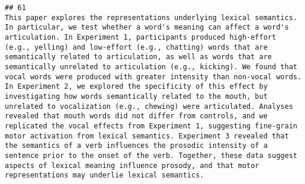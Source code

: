 \documentclass[
  english,
  man]{apa6}
\begin{document}
\begin{verbatim}
## 61                                                                                                                                                                                                                                                                                                                                                                                                                                                                                                                                                                                                                                                                                                                                                                                                                                                                                                                                                                                                                                                                                                                                                                                                                                                                                                                                                                                                                                                                                                                      This paper explores the representations underlying lexical semantics. In particular, we test whether a word's meaning can affect a word's articulation. In Experiment 1, participants produced high-effort (e.g., yelling) and low-effort (e.g., chatting) words that are semantically related to articulation, as well as words that are semantically unrelated to articulation (e.g., kicking). We found that vocal words were produced with greater intensity than non-vocal words. In Experiment 2, we explored the specificity of this effect by investigating how words semantically related to the mouth, but unrelated to vocalization (e.g., chewing) were articulated. Analyses revealed that mouth words did not differ from controls, and we replicated the vocal effects from Experiment 1, suggesting fine-grain motor activation from lexical semantics. Experiment 3 revealed that the semantics of a verb influences the prosodic intensity of a sentence prior to the onset of the verb. Together, these data suggest aspects of lexical meaning influence prosody, and that motor representations may underlie lexical semantics.

\end{verbatim}
\end{document}
